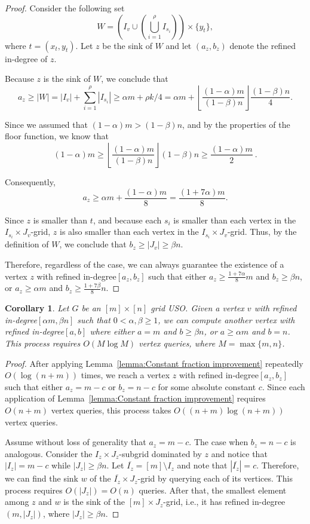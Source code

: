 \documentclass[a4paper,10pt]{article}
\newtheorem{corollary}{Corollary}
\newcommand{\indegree}{refined in-degree\xspace}
\begin{document}
\begin{proof}
Consider the following set $$W = \left(I_v\cup \left(\bigcup_{i=1}^\rho I_{s_i}\right)\right)\times \{y_t\},$$
where $t = (x_t, y_t)$.
Let $z$ be the sink of $W$ and let $(a_z, b_z)$ denote the \indegree of $z$.

Because $z$ is the sink of $W$, we conclude that 
$$a_z \geq |W|  = |I_v| + \sum_{i=1}^\rho |I_{s_i}| \geq
\alpha m + \rho k/4  = \alpha m +  \left\lfloor \frac{(1-\alpha)m}{(1-\beta)n} \right\rfloor \frac{(1-\beta) n}{4}.$$

Since we assumed that $(1 - \alpha) m > (1-\beta) n$, and by the properties of the floor function, we know that $$(1 - \alpha) m \geq \left \lfloor \frac{(1-\alpha)m}{(1-\beta)n} \right \rfloor (1-\beta)n \geq \frac{(1 - \alpha) m}{2} \ .$$

Consequently, 
$$a_z \geq \alpha m + \frac{(1-\alpha)m}{8} = \frac{(1 + 7\alpha) m}{8}.$$

Since $z$ is smaller than $t$, and 
because each $s_i$ is smaller than each vertex in the $I_{s_i}\times J_v$-grid, $z$ is also smaller than each vertex in the $I_{s_i}\times J_v$-grid. Thus, by the definition of $W$, we conclude that $b_z \geq |J_v| \geq \beta n$.

Therefore, regardless of the case, we can always guarantee the existence of a vertex $z$ with \indegree $[a_z,b_z]$ such that either $a_z\geq \frac{1+7\alpha}{8}m$ and $b_z \geq \beta n$, or $a_z \geq \alpha m$ and $b_z \geq \frac{1 + 7\beta}{8}n$.
\end{proof}

\begin{corollary}\label{corollary:Expansion to the wall}
Let $G$ be an $[m]\times[n]$ grid USO. 
Given a vertex $v$ with \indegree $[\alpha m, \beta n]$ such that $0 < \alpha, \beta \geq 1$, we can compute another vertex with \indegree $[a,b]$ where either $a = m$ and $b \geq \beta n$, or $a \geq \alpha m$ and $b  = n$. This process requires $O(M \log M)$ vertex queries, where $M = \max\{m,n\}$.
\end{corollary}
\begin{proof}
After applying Lemma~\ref{lemma:Constant fraction improvement} repeatedly $O(\log(n + m))$ times, we reach a vertex $z$ with \indegree $[a_z, b_z]$ such that either $a_z = m - c$ or $b_z = n- c$ for some absolute constant $c$. 
Since each application of Lemma~\ref{lemma:Constant fraction improvement} requires $O(n+m)$ vertex queries, this process takes $O((n + m) \log (n+m))$ vertex queries.

Assume without loss of generality that $a_z = m-c$. The case when $b_z = n-c$ is analogous. 
Consider the  $I_z\times J_z$-subgrid dominated by $z$ and 
notice that $|I_z| = m-c$ while $|J_z| \geq \beta n$. 
Let $\overline{I_z} = [m] \setminus I_z$ and note that $|\overline{I_z}| = c$. Therefore, we can find the sink $w$ of the $\overline{I_z}\times J_z$-grid by querying each of its vertices. This process requires $O(|J_z|) = O(n)$ queries.  After that, the smallest element among $z$ and $w$ is the sink of the $[m]\times J_z$-grid, i.e., it has \indegree $(m, |J_z|)$, where $|J_z|  \geq \beta n$.
\end{proof}
\end{document}
